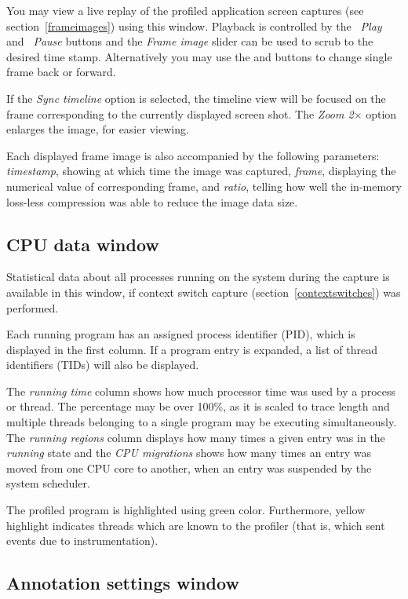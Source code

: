 \documentclass[hidelinks,titlepage,a4paper]{article}
\begin{document}
You may view a live replay of the profiled application screen captures (see section~\ref{frameimages}) using this window. Playback is controlled by the \emph{\faPlay~Play} and \emph{\faPause~Pause} buttons and the \emph{Frame image} slider can be used to scrub to the desired time stamp. Alternatively you may use the \emph{\faCaretLeft} and \emph{\faCaretRight} buttons to change single frame back or forward.

If the \emph{Sync timeline} option is selected, the timeline view will be focused on the frame corresponding to the currently displayed screen shot. The \emph{Zoom 2$\times$} option enlarges the image, for easier viewing.

Each displayed frame image is also accompanied by the following parameters: \emph{timestamp}, showing at which time the image was captured, \emph{frame}, displaying the numerical value of corresponding frame, and \emph{ratio}, telling how well the in-memory loss-less compression was able to reduce the image data size.

\subsection{CPU data window}
\label{cpudata}

Statistical data about all processes running on the system during the capture is available in this window, if context switch capture (section~\ref{contextswitches}) was performed.

Each running program has an assigned process identifier (PID), which is displayed in the first column. If a program entry is expanded, a list of thread identifiers (TIDs) will also be displayed.

The \emph{running time} column shows how much processor time was used by a process or thread. The percentage may be over 100\%, as it is scaled to trace length and multiple threads belonging to a single program may be executing simultaneously. The \emph{running regions} column displays how many times a given entry was in the \emph{running} state and the \emph{CPU migrations} shows how many times an entry was moved from one CPU core to another, when an entry was suspended by the system scheduler.

The profiled program is highlighted using green color. Furthermore, yellow highlight indicates threads which are known to the profiler (that is, which sent events due to instrumentation).

\subsection{Annotation settings window}
\label{annotationsettings}
\end{document}
